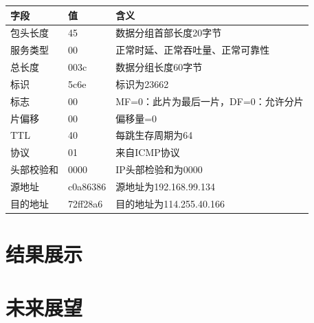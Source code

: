 \documentclass[a4paper, 14pt, oneside]{book} %
\numberwithin{equation}{subsection}
\begin{document}
	\begin{table}[H]
		\centering
		\begin{tabular}{lll}
			\hline
			字段 & 值 & 含义 \\ \hline
			包头长度 & 45 & 数据分组首部长度20字节 \\ \hline
			服务类型 & 00 & 正常时延、正常吞吐量、正常可靠性 \\ \hline
			总长度 & 003c & 数据分组长度60字节 \\ \hline
			标识 & 5c6e & 标识为23662 \\ \hline
			标志 & 00 & MF=0：此片为最后一片，DF=0：允许分片 \\ \hline
			片偏移 & 00 & 偏移量=0 \\ \hline
			TTL & 40 & 每跳生存周期为64 \\ \hline
			协议 & 01 & 来自ICMP协议 \\ \hline
			头部校验和 & 0000 & IP头部检验和为0000 \\ \hline
			源地址 & c0a86386 & 源地址为192.168.99.134 \\ \hline
			目的地址 & 72ff28a6 & 目的地址为114.255.40.166 \\ \hline
		\end{tabular}
	\end{table}
	
	\section{结果展示}
	
	\section{未来展望}
	
\end{document}
